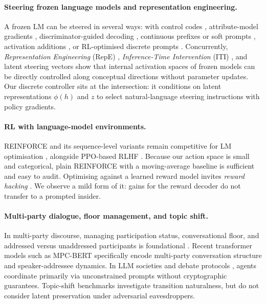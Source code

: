 \documentclass[10pt,a4paper,twocolumn]{article}
\newcommand{\1}{\mathbb{1}}
\begin{document}
\paragraph{Steering frozen language models and representation engineering.}
A frozen LM can be steered in several ways: with control codes \citep{keskar2019ctrl}, attribute-model gradients \citep{dathathri2020pplm}, discriminator-guided decoding \citep{krause2021gedi}, continuous prefixes or soft prompts \citep{li2021prefix,lester2021power}, activation additions \citep{turner2023activation}, or RL-optimised discrete prompts \citep{deng2022rlprompt}. Concurrently, \emph{Representation Engineering} (RepE) \citep{zou2023representation}, \emph{Inference-Time Intervention} (ITI) \citep{li2023inference}, and latent steering vectors \citep{subramani2022extracting} show that internal activation spaces of frozen models can be directly controlled along conceptual directions without parameter updates. Our discrete controller sits at the intersection: it conditions on latent representations $\phi(h)$ and $z$ to select natural-language steering instructions with policy gradients.

\paragraph{RL with language-model environments.}
REINFORCE \citep{williams1992simple} and its sequence-level variants \citep{ranzato2016sequence} remain competitive for LM optimisation \citep{ahmadian2024back}, alongside PPO-based RLHF \citep{schulman2017ppo,ouyang2022training}. Because our action space is small and categorical, plain REINFORCE with a moving-average baseline is sufficient and easy to audit. Optimising against a learned reward model invites \emph{reward hacking} \citep{skalse2022defining}. We observe a mild form of it: gains for the reward decoder do not transfer to a prompted insider.

\paragraph{Multi-party dialogue, floor management, and topic shift.}
In multi-party discourse, managing participation status, conversational floor, and addressed versus unaddressed participants is foundational \citep{traum2004issues}. Recent transformer models such as MPC-BERT \citep{gu2022mpc} specifically encode multi-party conversation structure and speaker-addressee dynamics. In LLM societies \citep{park2023generative,li2023camel} and debate protocols \citep{du2024debate}, agents coordinate primarily via unconstrained prompts without cryptographic guarantees. Topic-shift benchmarks \citep{xie2021tiage,sevegnani2021otters} investigate transition naturalness, but do not consider latent preservation under adversarial eavesdroppers.
\end{document}
